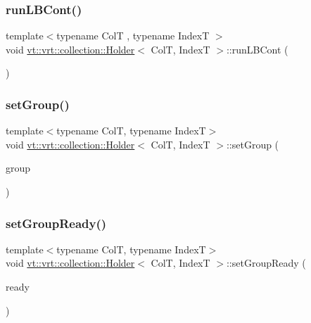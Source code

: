 \subsubsection{\texorpdfstring{run\+L\+B\+Cont()}{runLBCont()}\hspace{0.1cm}{\footnotesize\ttfamily [2/2]}}
{\footnotesize\ttfamily template$<$typename ColT , typename IndexT $>$ \\
void \hyperlink{structvt_1_1vrt_1_1collection_1_1_holder}{vt\+::vrt\+::collection\+::\+Holder}$<$ ColT, IndexT $>$\+::run\+L\+B\+Cont (\begin{DoxyParamCaption}{ }\end{DoxyParamCaption})}

\mbox{\label{structvt_1_1vrt_1_1collection_1_1_holder_ad1004d701690d7de8d323de1d5bc1a29}} 
\subsubsection{\texorpdfstring{set\+Group()}{setGroup()}}
{\footnotesize\ttfamily template$<$typename ColT, typename IndexT$>$ \\
void \hyperlink{structvt_1_1vrt_1_1collection_1_1_holder}{vt\+::vrt\+::collection\+::\+Holder}$<$ ColT, IndexT $>$\+::set\+Group (\begin{DoxyParamCaption}\item[{\hyperlink{namespacevt_a27b5e4411c9b6140c49100e050e2f743}{Group\+Type} const \&}]{group }\end{DoxyParamCaption})\hspace{0.3cm}{\ttfamily [inline]}}

\mbox{\label{structvt_1_1vrt_1_1collection_1_1_holder_aa666f9e2960605203d325fd39de82dd7}} 
\subsubsection{\texorpdfstring{set\+Group\+Ready()}{setGroupReady()}}
{\footnotesize\ttfamily template$<$typename ColT, typename IndexT$>$ \\
void \hyperlink{structvt_1_1vrt_1_1collection_1_1_holder}{vt\+::vrt\+::collection\+::\+Holder}$<$ ColT, IndexT $>$\+::set\+Group\+Ready (\begin{DoxyParamCaption}\item[{bool const}]{ready }\end{DoxyParamCaption})\hspace{0.3cm}{\ttfamily [inline]}}

